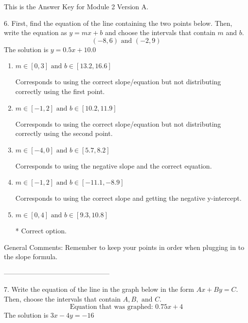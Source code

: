\documentclass{article}[10pt]
\begin{document}
This is the Answer Key for Module 2 Version A.

6. First, find the equation of the line containing the two points below. Then, write the equation as $ y=mx+b $ and choose the intervals that contain $m$ and $b$.
$$ (-8, 6) \text{ and } (-2, 9) $$ 
The solution is $ y = 0.5 x + 10.0 $ 

\begin{enumerate}[label=\Alph*.] 
\item $ m \in [0, 3] \text{ and } b \in [13.2, 16.6] $ 

  Corresponds to using the correct slope/equation but not distributing correctly using the first point. 
\item $ m \in [-1, 2] \text{ and } b \in [10.2, 11.9] $ 

  Corresponds to using the correct slope/equation but not distributing correctly using the second point. 
\item $ m \in [-4, 0] \text{ and } b \in [5.7, 8.2] $ 

  Corresponds to using the negative slope and the correct equation. 
\item $ m \in [-1, 2] \text{ and } b \in [-11.1, -8.9] $ 

  Corresponds to using the correct slope and getting the negative y-intercept. 
\item $ m \in [0, 4] \text{ and } b \in [9.3, 10.8] $ 

 * Correct option. 
\end{enumerate} 
 
General Comments: Remember to keep your points in order when plugging in to the slope formula.

-----------------------------------------------

7. Write the equation of the line in the graph below in the form $Ax+By=C$. Then, choose the intervals that contain $A, B, \text{ and } C$.
$$ \text{Equation that was graphed: } 0.75 x + 4 $$ 
The solution is $ 3 x - 4 y = -16 $ 
\end{document}

